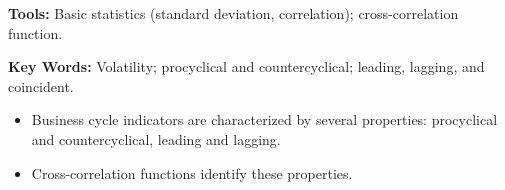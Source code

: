 \textbf{Tools:} Basic statistics (standard deviation, correlation); cross-correlation function.

\textbf{Key Words:} Volatility; procyclical and countercyclical; leading, lagging, and coincident.

\vspace{-0.1in}
\begin{itemize}
    \item Business cycle indicators are characterized by several properties:  procyclical and   countercyclical, leading and lagging.
    \item Cross-correlation functions identify these properties.
\end{itemize}
